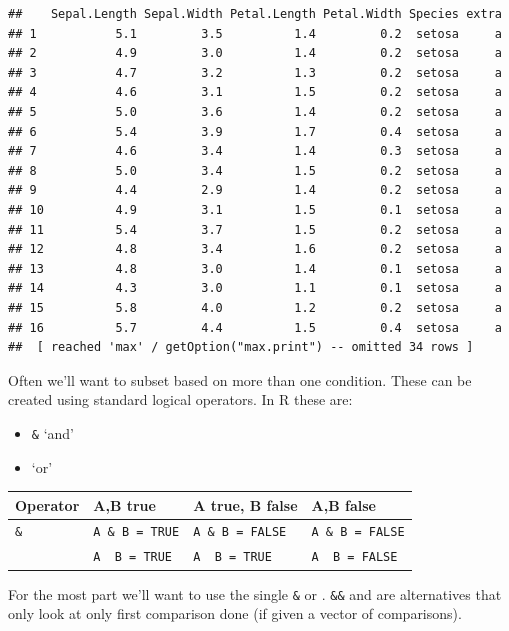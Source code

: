 \documentclass[
]{book}
\providecommand{\tightlist}{%
  \setlength{\itemsep}{0pt}\setlength{\parskip}{0pt}}
\theoremstyle{definition}
\theoremstyle{definition}
\theoremstyle{definition}
\theoremstyle{remark}
\begin{document}
\begin{verbatim}
##    Sepal.Length Sepal.Width Petal.Length Petal.Width Species extra
## 1           5.1         3.5          1.4         0.2  setosa     a
## 2           4.9         3.0          1.4         0.2  setosa     a
## 3           4.7         3.2          1.3         0.2  setosa     a
## 4           4.6         3.1          1.5         0.2  setosa     a
## 5           5.0         3.6          1.4         0.2  setosa     a
## 6           5.4         3.9          1.7         0.4  setosa     a
## 7           4.6         3.4          1.4         0.3  setosa     a
## 8           5.0         3.4          1.5         0.2  setosa     a
## 9           4.4         2.9          1.4         0.2  setosa     a
## 10          4.9         3.1          1.5         0.1  setosa     a
## 11          5.4         3.7          1.5         0.2  setosa     a
## 12          4.8         3.4          1.6         0.2  setosa     a
## 13          4.8         3.0          1.4         0.1  setosa     a
## 14          4.3         3.0          1.1         0.1  setosa     a
## 15          5.8         4.0          1.2         0.2  setosa     a
## 16          5.7         4.4          1.5         0.4  setosa     a
##  [ reached 'max' / getOption("max.print") -- omitted 34 rows ]
\end{verbatim}

Often we'll want to subset based on more than one condition. These can be created using standard logical operators. In R these are:

\begin{itemize}
\tightlist
\item
  \texttt{\&} `and'
\item
  \texttt{\textbar{}} `or'
\end{itemize}

\begin{longtable}[]{@{}llll@{}}
\toprule
Operator & A,B true & A true, B false & A,B false\tabularnewline
\midrule
\endhead
\texttt{\&} & \texttt{A\ \&\ B\ =\ TRUE} & \texttt{A\ \&\ B\ =\ FALSE} & \texttt{A\ \&\ B\ =\ FALSE}\tabularnewline
\texttt{\textbar{}} & \texttt{A\ \textbar{}\ B\ =\ TRUE} & \texttt{A\ \textbar{}\ B\ =\ TRUE} & \texttt{A\ \textbar{}\ B\ =\ FALSE}\tabularnewline
\bottomrule
\end{longtable}

For the most part we'll want to use the single \texttt{\&} or \texttt{\textbar{}}. \texttt{\&\&} and \texttt{\textbar{}\textbar{}} are alternatives that only look at only first comparison done (if given a vector of comparisons).
\end{document}
